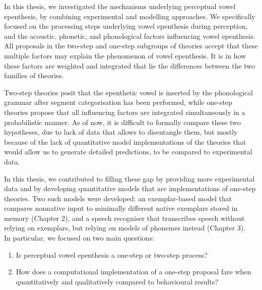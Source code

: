 
In this thesis, we investigated the mechanisms underlying perceptual vowel epenthesis, by combining experimental and modelling approaches. We specifically focused on the processing steps underlying vowel epenthesis during perception, and the acoustic, phonetic, and phonological factors influencing vowel epenthesis. All proposals in the two-step and one-step subgroups of theories accept that these multiple factors may explain the phenomenon of vowel epenthesis. It is in how these factors are weighted and integrated that lie the differences between the two families of theories.

Two-step theories posit that the epenthetic vowel is inserted by the phonological grammar after segment categorisation has been performed, while one-step theories propose that all influencing factors are integrated simultaneously in a probabilistic manner. As of now, it is difficult to formally compare these two hypotheses, due to lack of data that allows to disentangle them, but mostly because of the lack of quantitative model implementations of the theories that would allow us to generate detailed predictions, to be compared to experimental data.

In this thesis, we contributed to filling these gap by providing more experimental data and by developing quantitative models that are implementations of one-step theories. Two such models were developed: an exemplar-based model that compares nonnative input to minimally different native exemplars stored in memory (Chapter 2), and a speech recogniser that transcribes speech without relying on exemplars, but relying on models of phonemes instead (Chapter 3). \\    

In particular, we focused on two main questions:
\begin{enumerate}
\item Is perceptual vowel epenthesis a one-step or two-step process?
\item How does a computational implementation of a one-step proposal fare when quantitatively and qualitatively compared to behavioural results? 
\end{enumerate}

